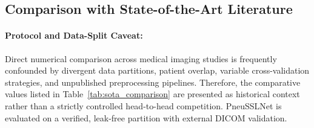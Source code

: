 \documentclass[journal,article,submit,moreauthors,pdftex]{Definitions/tsp}
\begin{document}
\subsection{Comparison with State-of-the-Art Literature} \label{sect:s4dot8}
\paragraph{Protocol and Data-Split Caveat:} Direct numerical comparison across medical imaging studies is frequently confounded by divergent data partitions, patient overlap, variable cross-validation strategies, and unpublished preprocessing pipelines. Therefore, the comparative values listed in Table~\ref{tab:sota_comparison} are presented as historical context rather than a strictly controlled head-to-head competition. PneuSSLNet is evaluated on a verified, leak-free partition with external DICOM validation.
\end{document}
